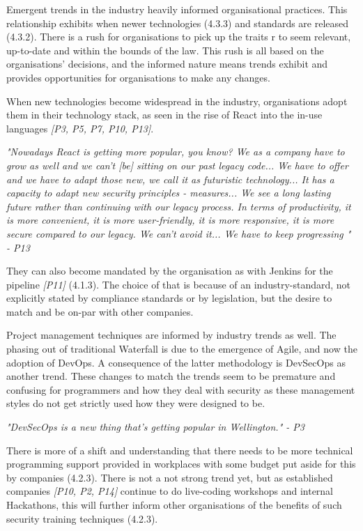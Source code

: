 Emergent trends in the industry heavily informed organisational practices. This relationship exhibits when newer technologies (4.3.3) and standards are released (4.3.2). There is a rush for organisations to pick up the traits r to seem relevant, up-to-date and within the bounds of the law. This rush is all based on the organisations' decisions, and the informed nature means trends exhibit and provides opportunities for organisations to make any changes. 
\newline
\par When new technologies become widespread in the industry, organisations adopt them in their technology stack, as seen in the rise of React into the in-use languages \textit{[P3, P5, P7, P10, P13]}. 
\newline
\par 
\textit{"Nowadays React is getting more popular, you know? We as a company have to grow as well and we can't [be] sitting on our past legacy code... We have to offer and we have to adapt those new, we call it as futuristic technology... It has a capacity to adapt new security principles - measures... We see a long lasting future rather than continuing with our legacy process. In terms of productivity, it is more convenient, it is more user-friendly, it is more responsive, it is more secure compared to our legacy. We can't avoid it... We have to keep progressing " - P13 }
\newline
\par
They can also become mandated by the organisation as with Jenkins for the pipeline \textit{[P11]} (4.1.3). The choice of that is because of an industry-standard, not explicitly stated by compliance standards or by legislation, but the desire to match and be on-par with other companies.
\newline
\par 
Project management techniques are informed by industry trends as well. The phasing out of traditional Waterfall is due to the emergence of Agile, and now the adoption of DevOps. A consequence of the latter methodology is DevSecOps as another trend.  These changes to match the trends seem to be premature and confusing for programmers and how they deal with security as these management styles do not get strictly used how they were designed to be. 
\newline
\par
\textit{"DevSecOps is a new thing that's getting popular in Wellington." - P3}
\newline
\par
There is more of a shift and understanding that there needs to be more technical programming support provided in workplaces with some budget put aside for this by companies (4.2.3). There is not a not strong trend yet, but as established companies \textit{[P10, P2, P14]} continue to do live-coding workshops and internal Hackathons, this will further inform other organisations of the benefits of such security training techniques (4.2.3). 

